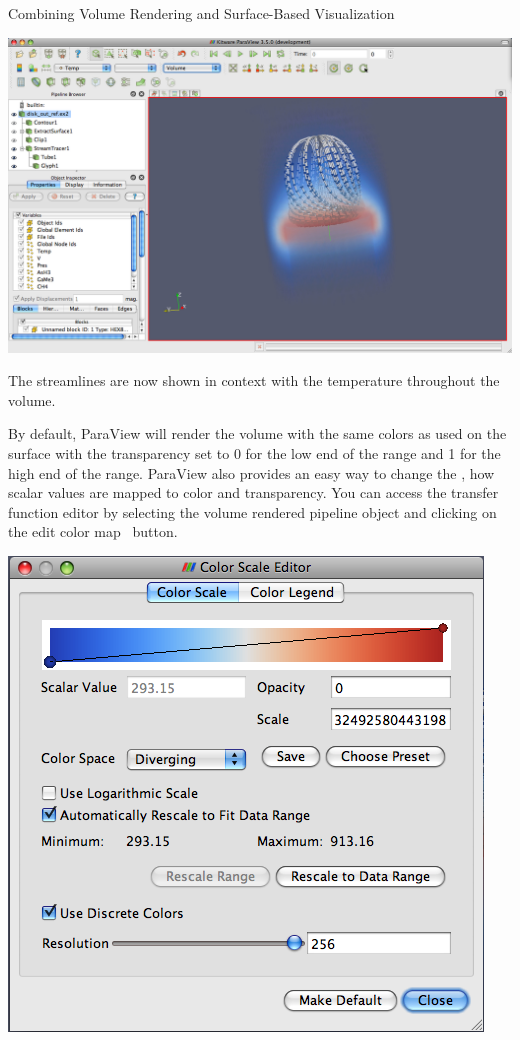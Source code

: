 \begin{exercise}{Combining Volume Rendering and Surface-Based Visualization}
  \begin{inlinefig}
    \includegraphics[width=\scw]{images/VolumeRender2}
  \end{inlinefig}

  The streamlines are now shown in context with the temperature throughout
  the volume.
\end{exercise}

By default, ParaView will render the volume with the same colors as used on
the surface with the transparency set to 0 for the low end of the range and
1 for the high end of the range.  ParaView also provides an easy way to
change the , how scalar values are mapped to
color and transparency.  You can access the transfer function editor by
selecting the volume rendered pipeline object and clicking on the edit
color map~ button.

\begin{inlinefig}
  \includegraphics[width=.83\scw]{images/ColorScaleEditor}
\end{inlinefig}

